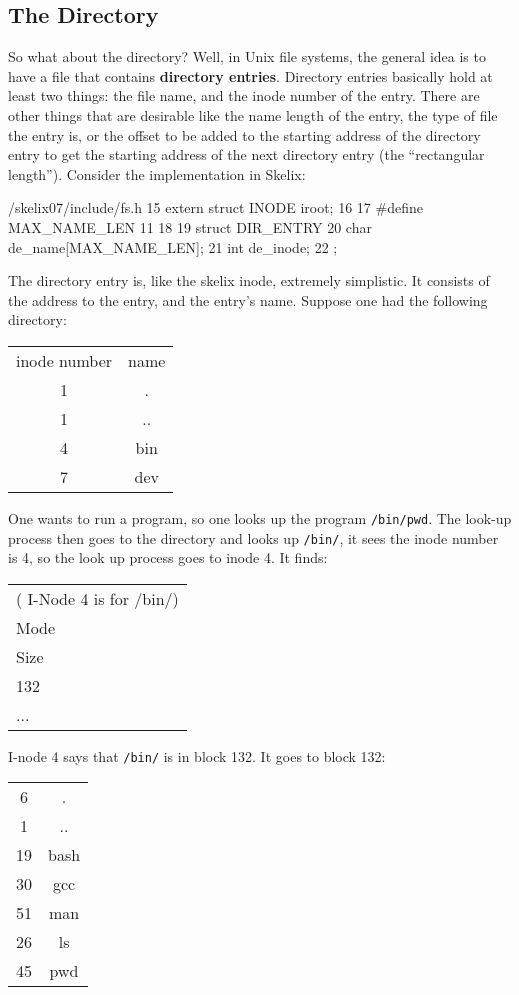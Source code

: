 \subsection{The Directory}

So what about the directory? Well, in Unix file systems, the general idea is to have a file that contains \textbf{directory entries}. Directory entries basically hold at least two things: 
the file name, 
and the inode number of the entry. 
There are other things that are desirable like the name length of the entry, the type of file the entry is, or the offset to be added to the starting address of the directory entry to get the starting address of the next directory entry (the ``rectangular length''). Consider the implementation in Skelix:


\begin{code}{/skelix07/include/fs.h}
15 extern struct INODE iroot;
16 
17 #define MAX_NAME_LEN 11
18 
19 struct DIR_ENTRY {
20      char de_name[MAX_NAME_LEN];
21      int de_inode;
22 };
\end{code}
The directory entry is, like the skelix inode, extremely simplistic. It consists of the address to the entry, and the entry's name. Suppose one had the following directory:

\begin{tabular}{cc}
 \textrm{inode number} & \textrm{name} \\
 1  & . \\
 1 & .. \\
 4 & \textrm{bin} \\
 7 & \textrm{dev} 
\end{tabular}

One wants to run a program, so one looks up the program \verb|/bin/pwd|. The look-up process then goes to the directory and looks up \verb|/bin/|, it sees the inode number is 4, so the look up process goes to inode 4. It finds:

\begin{tabular}{l} \\
(\textrm{ I-Node 4 is for /bin/}) \\
\textrm{Mode} \\
\textrm{Size} \\
132 \\
...
\end{tabular}

I-node 4 says that \verb|/bin/| is in block 132. It goes to block 132:

\begin{tabular}{cc}
 6 & . \\
 1 & .. \\
 19 & \textrm{bash} \\
 30 & \textrm{gcc} \\
 51 & \textrm{man} \\
 26 & \textrm{ls} \\
 45 & \textrm{pwd} 
\end{tabular}


